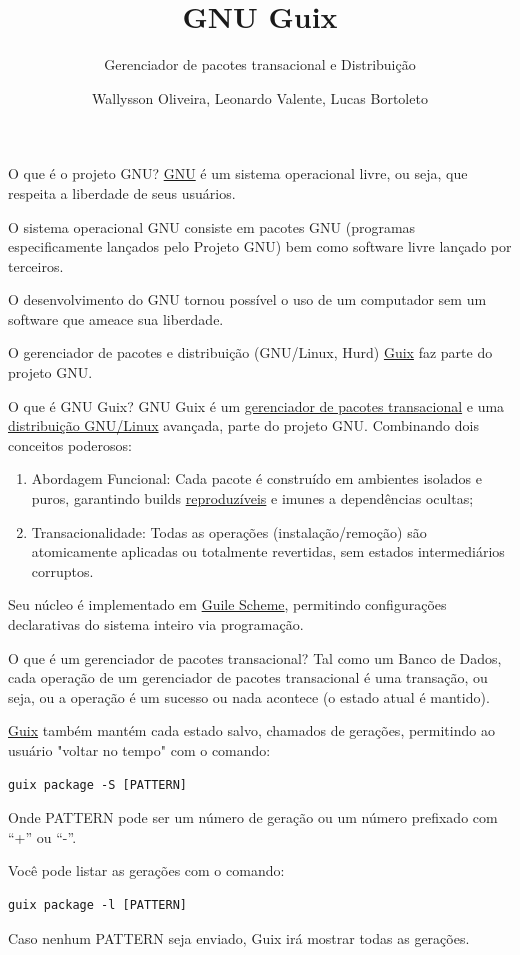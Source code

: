 \documentclass[bigger]{beamer}
\author{Wallysson Oliveira, Leonardo Valente, Lucas Bortoleto}
\date{}
\title{GNU Guix}
\subtitle{Gerenciador de pacotes transacional e Distribuição}
\begin{document}
\maketitle
\begin{frame}[label={sec:orgdab10c9}]{O que é o projeto GNU?}
\href{https://www.gnu.org/home.en.html}{GNU} é um sistema operacional livre, ou seja, que respeita a liberdade de seus usuários.

O sistema operacional GNU consiste em pacotes GNU (programas especificamente lançados pelo Projeto GNU)
bem como software livre lançado por terceiros.

O desenvolvimento do GNU tornou possível o uso de um computador sem um software que ameace sua liberdade.

O gerenciador de pacotes e distribuição (GNU/Linux, Hurd) \href{https://guix.gnu.org/}{Guix} faz parte do projeto GNU.
\end{frame}
\begin{frame}[label={sec:orgb66a109}]{O que é GNU Guix?}
GNU Guix é um \href{https://guix.gnu.org}{gerenciador de pacotes transacional} e uma \href{https://guix.gnu.org/manual/en/html\_node/System-Installation.html}{distribuição GNU/Linux} avançada, parte do projeto GNU.
Combinando dois conceitos poderosos:

\begin{enumerate}
\item Abordagem Funcional: Cada pacote é construído em ambientes isolados e puros,
garantindo builds \href{https://guix.gnu.org/manual/en/html\_node/Features.html}{reproduzíveis} e imunes a dependências ocultas;
\item Transacionalidade: Todas as operações (instalação/remoção) são atomicamente aplicadas ou totalmente
revertidas, sem estados intermediários corruptos.
\end{enumerate}

Seu núcleo é implementado em \href{https://www.gnu.org/software/guile}{Guile Scheme}, permitindo configurações declarativas do sistema inteiro via
programação.
\end{frame}
\begin{frame}[label={sec:orgf77a6fa},fragile]{O que é um gerenciador de pacotes transacional?}
 Tal como um Banco de Dados, cada operação de um gerenciador de pacotes transacional é uma transação, ou seja,
ou a operação é um sucesso ou nada acontece (o estado atual é mantido).

\href{https://guix.gnu.org/manual/en/html\_node/Package-Management.html}{Guix} também mantém cada estado salvo, chamados de gerações, permitindo ao usuário "voltar no tempo" com
o comando:
\begin{verbatim}
guix package -S [PATTERN]
\end{verbatim}
Onde PATTERN pode ser um número de geração ou um número prefixado com “+” ou “-”.

Você pode listar as gerações com o comando:
\begin{verbatim}
guix package -l [PATTERN]
\end{verbatim}
Caso nenhum PATTERN seja enviado, Guix irá mostrar todas as gerações.
\end{frame}
\end{document}
